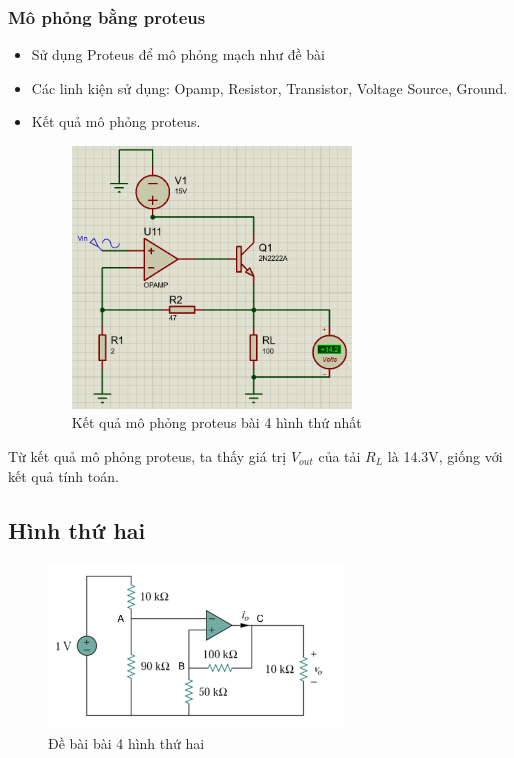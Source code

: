         \subsubsection{Mô phỏng bằng proteus}
            \begin{itemize}
                \item Sử dụng Proteus để mô phỏng mạch như đề bài
                \item Các linh kiện sử dụng: Opamp, Resistor, Transistor, Voltage Source, Ground.
                \item Kết quả mô phỏng proteus.
                \begin{figure}[H]
                    \centering
                    \includegraphics[width=0.7\textwidth]{pictures/result4_a.png}
                    \caption{Kết quả mô phỏng proteus bài 4 hình thứ nhất}
                \end{figure}
            \end{itemize}
            \hspace*{0.6cm}Từ kết quả mô phỏng proteus, ta thấy giá trị $V_{out}$ của tải $R_L$ là 14.3V, giống với kết quả tính toán.
    \subsection{Hình thứ hai}
        \begin{figure}[H]
            \centering
            \includegraphics[width=0.7\textwidth]{pictures/topic4_b.png}
            \caption{Đề bài bài 4 hình thứ hai}
        \end{figure}

